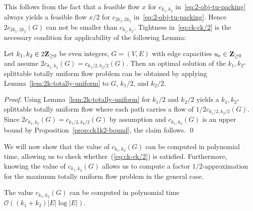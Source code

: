 This follows from the fact that a feasible flow $x$ for $c_{k_1,k_2}$
in~\eqref{eq:2-obj-tu-packing} always yields a feasible flow $x/2$
for $c_{2k_1,2k_2}$ in~\eqref{eq:2-obj-tu-packing}. Hence $2
c_{2k_1,2k_2}(G)$ can not be smaller than $c_{k_1,k_2}$. Tightness
in~\eqref{eq:ck-ck/2} is the necessary condition for
applicability of the following Lemma:

\begin{lemma}
  Let $k_1,k_2\in2\mathbf{Z}_{\geq0}$ be even integers, $G=(V,E)$ with edge capacities
  $u_e\in\mathbf{Z}_{\geq0}$ and assume
  $2c_{k_1,k_2}(G)=c_{k_1/2,k_2/2}(G)$. Then an optimal solution of the
  $k_1,k_2$-splittable totally uniform flow problem can be obtained by
  applying Lemma~\ref{lem:2k-totally-uniform} to $G$, $k_1/2$, and $k_2/2$.
\end{lemma}
\begin{proof}
  Using Lemma~\ref{lem:2k-totally-uniform} for $k_1/2$ and $k_2/2$
  yields a $k_1,k_2$-splittable totally uniform flow where each path
  carries a flow of $1/2 c_{k_1/2,k_2/2}(G)$. Since $2
  c_{k_1,k_2}(G)=c_{k_1/2,k_2/2}(G)$  by assumption and
  $c_{k_1,k_2}(G)$ is an upper bound by
  Proposition~\ref{prop:ck1k2-bound}, the claim follows.
\qed \end{proof}


We will now show that the value of $c_{k_1,k_2}(G)$ can be computed in
polynomial time, allowing us to check whether~(\ref{eq:ck-ck/2}) is
satisfied. Furthermore, knowing the value of $c_{k_1,k_2}(G)$ allows
us to compute a factor $1/2$-approximation for the maximum totally
uniform flow problem in the general case.

\begin{lemma}
  The value $c_{k_1,k_2}(G)$ can be computed in polynomial time
  $\mathcal{O}((k_1+k_2)|E|\log|E|)$.
\end{lemma}

